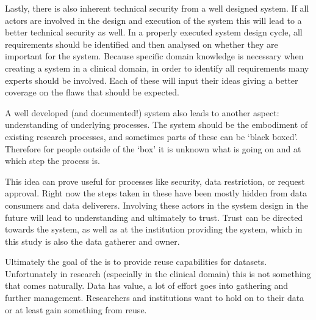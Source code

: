 Lastly, there is also inherent technical security from a well designed system.
If all actors are involved in the design and execution of the system this will lead to a better technical security as well.
In a properly executed system design cycle, all requirements should be identified and then analysed on whether they are important for the system.
Because specific domain knowledge is necessary when creating a system in a clinical domain, in order to identify all requirements many experts should be involved.
Each of these will input their ideas giving a better coverage on the flaws that should be expected.

A well developed (and documented!) system also leads to another aspect: understanding of underlying processes.
The system should be the embodiment of existing research processes, and  sometimes parts of these can be `black boxed'.
Therefore for people outside of the `box' it is unknown what is going on and at which step the process is.

This idea can prove useful for processes like security, data restriction, or request approval.
Right now the steps taken in these have been mostly hidden from data consumers and data deliverers.
Involving these actors in the system design in the future will lead to understanding and ultimately to trust.
Trust can be directed towards the system, as well as at the institution providing the system, which in this study is also the data gatherer and owner.


Ultimately the goal of the \ivfsystem{} is to provide reuse capabilities for datasets.
Unfortunately in research (especially in the clinical domain) this is not something that comes naturally.
Data has value, a lot of effort goes into gathering and further management.
Researchers and institutions want to hold on to their data or at least gain something from reuse.

